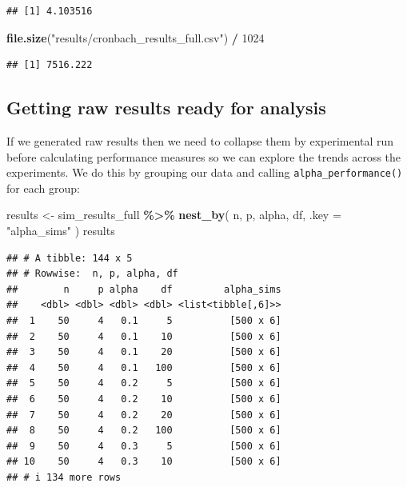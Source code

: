\documentclass[
]{book}
\newenvironment{Shaded}{\begin{snugshade}}{\end{snugshade}}
\newcommand{\AttributeTok}[1]{\textcolor[rgb]{0.13,0.29,0.53}{#1}}
\newcommand{\DecValTok}[1]{\textcolor[rgb]{0.00,0.00,0.81}{#1}}
\newcommand{\FunctionTok}[1]{\textcolor[rgb]{0.13,0.29,0.53}{\textbf{#1}}}
\newcommand{\NormalTok}[1]{#1}
\newcommand{\OtherTok}[1]{\textcolor[rgb]{0.56,0.35,0.01}{#1}}
\newcommand{\SpecialCharTok}[1]{\textcolor[rgb]{0.81,0.36,0.00}{\textbf{#1}}}
\newcommand{\StringTok}[1]{\textcolor[rgb]{0.31,0.60,0.02}{#1}}
\begin{document}
\begin{verbatim}
## [1] 4.103516
\end{verbatim}

\begin{Shaded}
\begin{Highlighting}[]
\FunctionTok{file.size}\NormalTok{(}\StringTok{"results/cronbach\_results\_full.csv"}\NormalTok{) }\SpecialCharTok{/} \DecValTok{1024}
\end{Highlighting}
\end{Shaded}

\begin{verbatim}
## [1] 7516.222
\end{verbatim}

\subsection{Getting raw results ready for analysis}\label{getting-raw-results-ready-for-analysis}

If we generated raw results then we need to collapse them by experimental run
before calculating performance measures so we can explore the trends across the
experiments.
We do this by grouping our data and calling \texttt{alpha\_performance()} for each group:

\begin{Shaded}
\begin{Highlighting}[]
\NormalTok{results }\OtherTok{\textless{}{-}}\NormalTok{ sim\_results\_full }\SpecialCharTok{\%\textgreater{}\%}
  \FunctionTok{nest\_by}\NormalTok{( n, p, alpha, df, }\AttributeTok{.key =} \StringTok{"alpha\_sims"}\NormalTok{ )}
\NormalTok{results}
\end{Highlighting}
\end{Shaded}

\begin{verbatim}
## # A tibble: 144 x 5
## # Rowwise:  n, p, alpha, df
##        n     p alpha    df         alpha_sims
##    <dbl> <dbl> <dbl> <dbl> <list<tibble[,6]>>
##  1    50     4   0.1     5          [500 x 6]
##  2    50     4   0.1    10          [500 x 6]
##  3    50     4   0.1    20          [500 x 6]
##  4    50     4   0.1   100          [500 x 6]
##  5    50     4   0.2     5          [500 x 6]
##  6    50     4   0.2    10          [500 x 6]
##  7    50     4   0.2    20          [500 x 6]
##  8    50     4   0.2   100          [500 x 6]
##  9    50     4   0.3     5          [500 x 6]
## 10    50     4   0.3    10          [500 x 6]
## # i 134 more rows
\end{verbatim}
\end{document}
